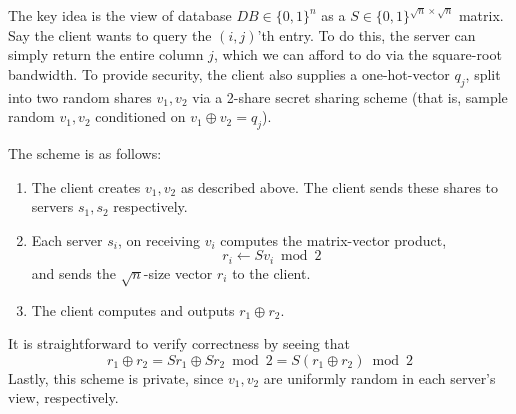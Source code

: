 The key idea is the view of database $DB \in \{0,1\}^n$ as a $S \in \{0,1\}^{\sqrt{n} \times \sqrt{n}}$ matrix. Say the client wants to query the $(i,j)$'th entry. To do this, the server can simply return the entire column $j$, which we can afford to do via the square-root bandwidth. To provide security, the client also supplies a one-hot-vector $q_j$, split into two random shares $v_{1},v_{2}$ via a 2-share secret sharing scheme (that is, sample random $v_1,v_2$ conditioned on $v_1 \oplus v_2 = q_{j}$).

The scheme is as follows:
\begin{enumerate}
	\item The client creates $v_{1},v_{2}$ as described above. The client sends these shares to servers $s_{1},s_{2}$ respectively.
	\item Each server $s_{i}$, on receiving $v_{i}$ computes the matrix-vector product,
	\[r_{i} \leftarrow S v_{i} \bmod 2\]
	and sends the $\sqrt{n}$-size vector $r_{i}$ to the client.
	\item The client computes and outputs $r_{1} \oplus r_{2}$.
\end{enumerate}
It is straightforward to verify correctness by seeing that
\[r_{1} \oplus r_{2} = S r_{1} \oplus Sr_{2} \bmod 2 = S (r_{1} \oplus r_{2}) \bmod 2\]
Lastly, this scheme is private, since $v_{1},v_{2}$ are uniformly random in each server's view, respectively.

